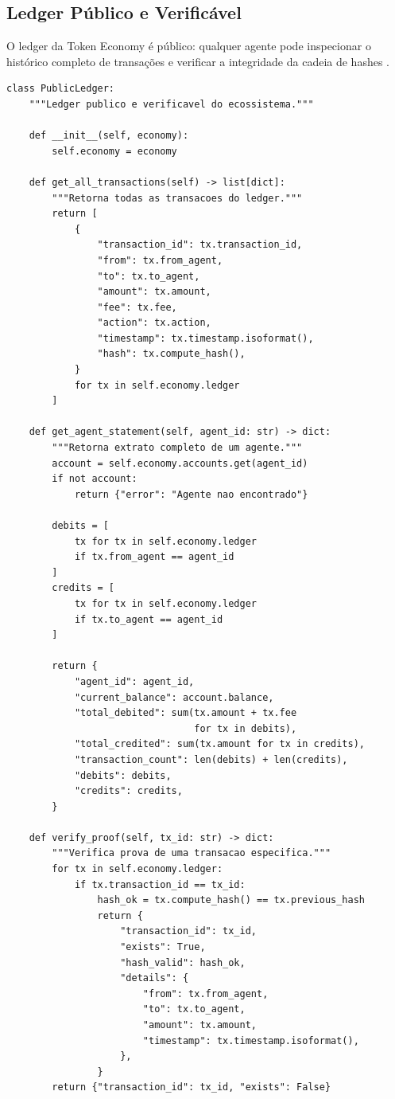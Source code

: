 \subsection{Ledger Público e Verificável}

O ledger da Token Economy é público: qualquer agente pode
inspecionar o histórico completo de transações e verificar a
integridade da cadeia de hashes \cite{opencode2026token,
nakamoto2008bitcoin}.

\begin{lstlisting}[caption={Ledger publico e verificavel},
                  label={lst:ledger-publico}]
class PublicLedger:
    """Ledger publico e verificavel do ecossistema."""

    def __init__(self, economy):
        self.economy = economy

    def get_all_transactions(self) -> list[dict]:
        """Retorna todas as transacoes do ledger."""
        return [
            {
                "transaction_id": tx.transaction_id,
                "from": tx.from_agent,
                "to": tx.to_agent,
                "amount": tx.amount,
                "fee": tx.fee,
                "action": tx.action,
                "timestamp": tx.timestamp.isoformat(),
                "hash": tx.compute_hash(),
            }
            for tx in self.economy.ledger
        ]

    def get_agent_statement(self, agent_id: str) -> dict:
        """Retorna extrato completo de um agente."""
        account = self.economy.accounts.get(agent_id)
        if not account:
            return {"error": "Agente nao encontrado"}

        debits = [
            tx for tx in self.economy.ledger
            if tx.from_agent == agent_id
        ]
        credits = [
            tx for tx in self.economy.ledger
            if tx.to_agent == agent_id
        ]

        return {
            "agent_id": agent_id,
            "current_balance": account.balance,
            "total_debited": sum(tx.amount + tx.fee
                                 for tx in debits),
            "total_credited": sum(tx.amount for tx in credits),
            "transaction_count": len(debits) + len(credits),
            "debits": debits,
            "credits": credits,
        }

    def verify_proof(self, tx_id: str) -> dict:
        """Verifica prova de uma transacao especifica."""
        for tx in self.economy.ledger:
            if tx.transaction_id == tx_id:
                hash_ok = tx.compute_hash() == tx.previous_hash
                return {
                    "transaction_id": tx_id,
                    "exists": True,
                    "hash_valid": hash_ok,
                    "details": {
                        "from": tx.from_agent,
                        "to": tx.to_agent,
                        "amount": tx.amount,
                        "timestamp": tx.timestamp.isoformat(),
                    },
                }
        return {"transaction_id": tx_id, "exists": False}
\end{lstlisting}

